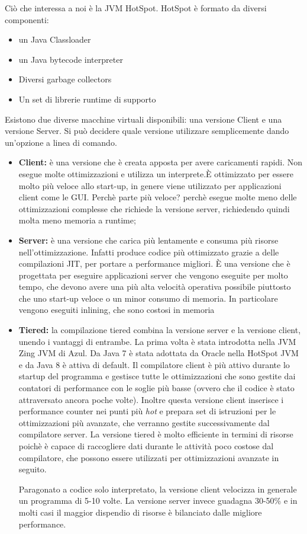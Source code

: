 \documentclass[a4paper, 11pt,            %
openright,               %
italian,
english                 
]{article}       %
\begin{document}
	Ciò che interessa a noi è la JVM HotSpot. HotSpot è formato da diversi componenti:
	
	\begin{itemize}
		\item un Java Classloader
		\item un Java bytecode interpreter
		\item Diversi garbage collectors
		\item Un set di librerie runtime di supporto
	\end{itemize}
	
	Esistono due diverse macchine virtuali disponibili: una versione Client e una versione Server. Si può decidere quale versione utilizzare semplicemente dando un'opzione a linea di comando. 
	
	\begin{itemize}
		\item \textbf{Client:} è una versione che è creata apposta per avere caricamenti rapidi. Non esegue molte ottimizzazioni e utilizza un interprete.È ottimizzato per essere molto più veloce allo start-up, in genere viene utilizzato per applicazioni client come le GUI. Perchè parte più veloce? perchè esegue molte meno delle ottimizzazioni complesse che richiede la versione server, richiedendo quindi molta meno memoria a runtime;
		\item \textbf{Server:} è una versione che carica più lentamente e consuma più risorse nell'ottimizzazione. Infatti produce codice più ottimizzato grazie a delle compilazioni JIT, per portare a performance migliori. È una versione che è progettata per eseguire applicazioni server che vengono eseguite per molto tempo, che devono avere una più alta velocità operativa possibile piuttosto che uno start-up veloce o un minor consumo di memoria. In particolare vengono eseguiti inlining, che sono costosi in memoria
		\item \textbf{Tiered:} la compilazione tiered combina la versione server e la versione client, unendo i vantaggi di entrambe. La prima volta è stata introdotta nella JVM Zing JVM di Azul. Da Java 7 è stata adottata da Oracle nella HotSpot JVM e da Java 8 è attiva di default. Il compilatore client è più attivo durante lo startup del programma e gestisce tutte le ottimizzazioni che sono gestite dai contatori di performance con le soglie più basse (ovvero che il codice è stato attraversato ancora poche volte). Inoltre questa versione client inserisce i performance counter nei punti più \textit{hot} e prepara set di istruzioni per le ottimizzazioni più avanzate, che verranno gestite successivamente dal compilatore server. La versione tiered è molto efficiente in termini di risorse poichè è capace di raccogliere dati durante le attività poco costose dal compilatore, che possono essere utilizzati per ottimizzazioni avanzate in seguito.
		
		Paragonato a codice solo interpretato, la versione client velocizza in generale un programma di 5-10 volte. La versione server invece guadagna 30-50\% e in molti casi il maggior dispendio di risorse è bilanciato dalle migliore performance. 
	\end{itemize}
	
\end{document}
